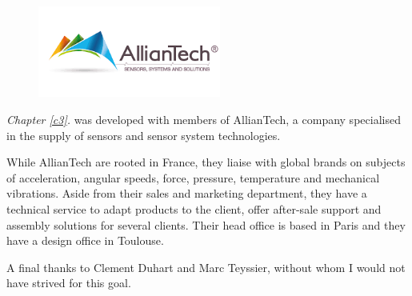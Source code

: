 \begin{figure}[!h]
      \includegraphics[width=6cm, left]{images/stage_sota/alliantech_logo.png}
\end{figure}

\textit{Chapter \ref{c3}. } was developed with members of AllianTech, a company specialised in the supply of sensors and sensor system technologies. 

While AllianTech are rooted in France, they liaise with global brands on subjects of acceleration, angular speeds, force, pressure, temperature and mechanical vibrations. Aside from their sales and marketing department, they have a  technical service to adapt products to the client, offer after-sale support and assembly solutions for several clients. Their head office is based in Paris and they have a design office in Toulouse.

A final thanks to Clement Duhart and Marc Teyssier, without whom I would not have strived for this goal. 
  





